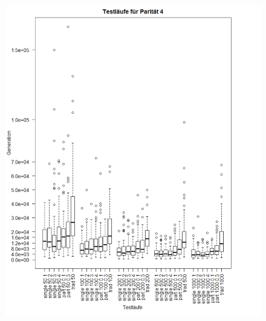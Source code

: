 \newpage
\begin{figure}[h !]
\includegraphics[scale=0.5]{parity4plotzoomed}
\caption[Testläufe Parität 4]{}
\end{figure}

